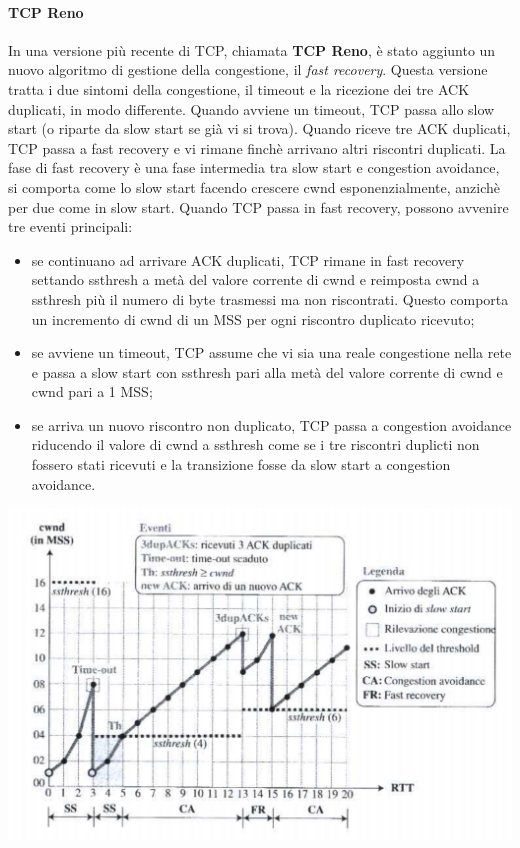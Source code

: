 \documentclass[12pt]{report}
\begin{document}
	\paragraph{TCP Reno}
	In una versione più recente di TCP, chiamata \textbf{TCP Reno}, è stato  aggiunto un nuovo algoritmo di gestione della congestione, il \textit{fast recovery}. Questa versione tratta i due sintomi della congestione, il timeout e la ricezione dei tre ACK duplicati, in modo differente. Quando avviene un timeout, TCP passa allo slow start (o riparte da slow start se già vi si trova). Quando riceve tre ACK duplicati, TCP passa a fast recovery e vi rimane finchè arrivano altri riscontri duplicati. La fase di fast recovery è una fase intermedia tra slow start e congestion avoidance, si comporta come lo slow start facendo crescere cwnd esponenzialmente, anzichè per due come in slow start. Quando TCP passa in fast recovery, possono avvenire tre eventi principali:
	\begin{itemize}
		\item se continuano ad arrivare ACK duplicati, TCP rimane in fast recovery settando ssthresh a metà del valore corrente di cwnd e reimposta cwnd a ssthresh più il numero di byte trasmessi ma non riscontrati. Questo comporta un incremento di cwnd di un MSS per ogni riscontro duplicato ricevuto;
		\item se avviene un timeout, TCP assume che vi sia una reale congestione nella rete e passa a slow start con ssthresh pari alla metà del valore corrente di cwnd e cwnd pari a 1 MSS;
		\item se arriva un nuovo riscontro non duplicato, TCP passa a congestion avoidance riducendo il valore di cwnd a ssthresh come se i tre riscontri duplicti non fossero stati ricevuti e la transizione fosse da slow start a congestion avoidance.
	\end{itemize}
	\begin{center}
		\includegraphics[scale=0.6]{assets/reno.png}
	\end{center}
\end{document}
